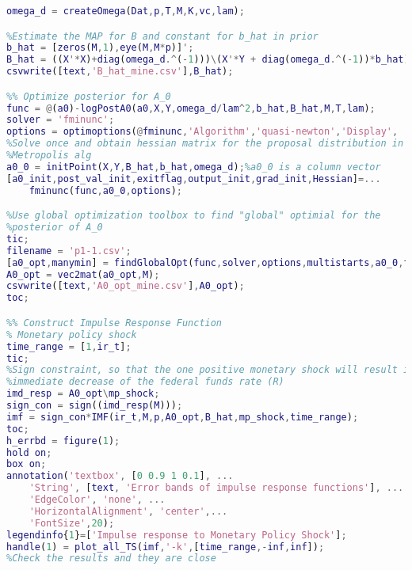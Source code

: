 \documentclass[11pt, oneside]{article}   	%
\begin{document}
\begin{appendices}
\begin{lstlisting}[language=Matlab ,caption={\textit{imf\textunderscore var.m} calculates the IMF variance based on shock given.}, label={code:imf_var}]
%Estimate elements of Omega
omega_d = createOmega(Dat,p,T,M,K,vc,lam);

%Estimate the MAP for B and constant for b_hat in prior
b_hat = [zeros(M,1),eye(M,M*p)]';
B_hat = ((X'*X)+diag(omega_d.^(-1)))\(X'*Y + diag(omega_d.^(-1))*b_hat);
csvwrite([text,'B_hat_mine.csv'],B_hat);

%% Optimize posterior for A_0
func = @(a0)-logPostA0(a0,X,Y,omega_d/lam^2,b_hat,B_hat,M,T,lam);
solver = 'fminunc';
options = optimoptions(@fminunc,'Algorithm','quasi-newton','Display', 'off');
%Solve once and obtain hessian matrix for the proposal distribution in
%Metropolis alg
a0_0 = initPoint(X,Y,B_hat,b_hat,omega_d);%a0_0 is a column vector
[a0_init,post_val_init,exitflag,output_init,grad_init,Hessian]=...
    fminunc(func,a0_0,options);

%Use global optimization toolbox to find "global" optimial for the
%posterior of A_0
tic;
filename = 'p1-1.csv';
[a0_opt,manymin] = findGlobalOpt(func,solver,options,multistarts,a0_0,filename);
A0_opt = vec2mat(a0_opt,M);
csvwrite([text,'A0_opt_mine.csv'],A0_opt);
toc;

%% Construct Impulse Response Function
% Monetary policy shock
time_range = [1,ir_t];
tic;
%Sign constraint, so that the one positive monetary shock will result in
%immediate decrease of the federal funds rate (R)
imd_resp = A0_opt\mp_shock;
sign_con = sign((imd_resp(M)));
imf = sign_con*IMF(ir_t,M,p,A0_opt,B_hat,mp_shock,time_range);
toc;
h_errbd = figure(1);
hold on;
box on;
annotation('textbox', [0 0.9 1 0.1], ...
    'String', [text, 'Error bands of impulse response functions'], ...
    'EdgeColor', 'none', ...
    'HorizontalAlignment', 'center',...
    'FontSize',20);
legendinfo{1}=['Impulse response to Monetary Policy Shock'];
handle(1) = plot_all_TS(imf,'-k',[time_range,-inf,inf]);
%Check the results and they are close


\end{lstlisting}
\end{appendices}
\end{document}
